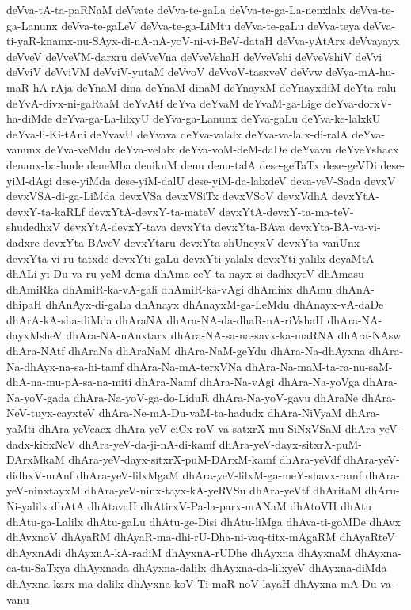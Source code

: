 {deVva-tA-ta-paRNaM
deVvate
deVva-te-gaLa
deVva-te-ga-La-nenxlalx
deVva-te-ga-Lanunx
deVva-te-gaLeV
deVva-te-ga-LiMtu
deVva-te-gaLu
deVva-teya
deVva-ti-yaR-knamx-nu-SAyx-di-nA-nA-yoV-ni-vi-BeV-dataH
deVva-yAtArx
deVvayayx
deVveV
deVveVM-darxru
deVveVna
deVveVshaH
deVveVshi
deVveVshiV
deVvi
deVviV
deVviVM
deVviV-yutaM
deVvoV
deVvoV-tasxveV
deVvw
deVya-mA-hu-maR-hA-rAja
deYnaM-dina
deYnaM-dinaM
deYnayxM
deYnayxdiM
deYta-ralu
deYvA-divx-ni-gaRtaM
deYvAtf
deYva
deYvaM
deYvaM-ga-Lige
deYva-dorxV-ha-diMde
deYva-ga-La-lilxyU
deYva-ga-Lanunx
deYva-gaLu
deYva-ke-lalxkU
deYva-li-Ki-tAni
deYvavU
deYvava
deYva-valalx
deYva-va-lalx-di-ralA
deYva-vanunx
deYva-veMdu
deYva-velalx
deYva-voM-deM-daDe
deYvavu
deYveYshacx
denanx-ba-hude
deneMba
denikuM
denu
denu-talA
dese-geTaTx
dese-geVDi
dese-yiM-dAgi
dese-yiMda
dese-yiM-dalU
dese-yiM-da-lalxdeV
deva-veV-Sada
devxV
devxVSA-di-ga-LiMda
devxVSa
devxVSiTx
devxVSoV
devxVdhA
devxYtA-devxY-ta-kaRLf
devxYtA-devxY-ta-mateV
devxYtA-devxY-ta-ma-teV-shudedhxV
devxYtA-devxY-tava
devxYta
devxYta-BAva
devxYta-BA-va-vi-dadxre
devxYta-BAveV
devxYtaru
devxYta-shUneyxV
devxYta-vanUnx
devxYta-vi-ru-tatxde
devxYti-gaLu
devxYti-yalalx
devxYti-yalilx
deyaMtA
dhALi-yi-Du-va-ru-yeM-dema
dhAma-ceY-ta-nayx-si-dadhxyeV
dhAmasu
dhAmiRka
dhAmiR-ka-vA-gali
dhAmiR-ka-vAgi
dhAminx
dhAmu
dhAnA-dhipaH
dhAnAyx-di-gaLa
dhAnayx
dhAnayxM-ga-LeMdu
dhAnayx-vA-daDe
dhArA-kA-sha-diMda
dhAraNA
dhAra-NA-da-dhaR-nA-riVshaH
dhAra-NA-dayxMsheV
dhAra-NA-nAnxtarx
dhAra-NA-sa-na-savx-ka-maRNA
dhAra-NAsw
dhAra-NAtf
dhAraNa
dhAraNaM
dhAra-NaM-geYdu
dhAra-Na-dhAyxna
dhAra-Na-dhAyx-na-sa-hi-tamf
dhAra-Na-mA-terxVNa
dhAra-Na-maM-ta-ra-nu-saM-dhA-na-mu-pA-sa-na-miti
dhAra-Namf
dhAra-Na-vAgi
dhAra-Na-yoVga
dhAra-Na-yoV-gada
dhAra-Na-yoV-ga-do-LiduR
dhAra-Na-yoV-gavu
dhAraNe
dhAra-NeV-tuyx-cayxteV
dhAra-Ne-mA-Du-vaM-ta-hadudx
dhAra-NiVyaM
dhAra-yaMti
dhAra-yeVcacx
dhAra-yeV-ciCx-roV-va-satxrX-mu-SiNxVSaM
dhAra-yeV-dadx-kiSxNeV
dhAra-yeV-da-ji-nA-di-kamf
dhAra-yeV-dayx-sitxrX-puM-DArxMkaM
dhAra-yeV-dayx-sitxrX-puM-DArxM-kamf
dhAra-yeVdf
dhAra-yeV-didhxV-mAnf
dhAra-yeV-lilxMgaM
dhAra-yeV-lilxM-ga-meY-shavx-ramf
dhAra-yeV-ninxtayxM
dhAra-yeV-ninx-tayx-kA-yeRVSu
dhAra-yeVtf
dhAritaM
dhAru-Ni-yalilx
dhAtA
dhAtavaH
dhAtirxV-Pa-la-parx-mANaM
dhAtoVH
dhAtu
dhAtu-ga-Lalilx
dhAtu-gaLu
dhAtu-ge-Disi
dhAtu-liMga
dhAva-ti-goMDe
dhAvx
dhAvxnoV
dhAyaRM
dhAyaR-ma-dhi-rU-Dha-ni-vaq-titx-mAgaRM
dhAyaRteV
dhAyxnAdi
dhAyxnA-kA-radiM
dhAyxnA-rUDhe
dhAyxna
dhAyxnaM
dhAyxna-ca-tu-SaTxya
dhAyxnada
dhAyxna-dalilx
dhAyxna-da-lilxyeV
dhAyxna-diMda
dhAyxna-karx-ma-dalilx
dhAyxna-koV-Ti-maR-noV-layaH
dhAyxna-mA-Du-va-vanu
}
